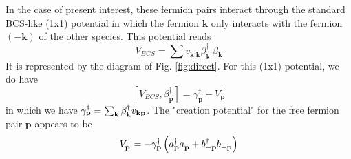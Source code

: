 \documentclass[aps,prb,superscriptaddress,twocolumn]{revtex4}
\newcommand{\vk}{\ensuremath{\mathbf{k}}}
\newcommand{\vp}{\ensuremath{\mathbf{p}}}
\begin{document}
In the case of present interest, these fermion pairs interact through the
standard BCS-like (1x1) potential in which the fermion $\mathbf{k} $ only
interacts with the fermion $\left(-\mathbf{k} \right) $ of the other
species. This potential reads 
\begin{equation}  \label{eq:vbcs}
V_{BCS}=\sum{v_{\mathbf{k} ^{\prime}\mathbf{k} }\beta^{\dagger}_{\mathbf{k}
^{\prime}}\beta^{}_{\mathbf{k} }}
\end{equation}
It is represented by the diagram of Fig. \ref{fig:direct}. For this (1x1)
potential, we do have 
\begin{equation}  \label{eq:vbeta}
\left[V_{BCS},\beta^{\dagger}_\vp\right] 
=\gamma^{\dagger}_\vp+V^{\dagger}_\vp
\end{equation}
in which we have $\gamma^{\dagger}_\vp=\sum_\vk\beta^{\dagger}_\vk{}v_{%
\mathbf{k} \mathbf{p} }$. The "creation potential" for the free fermion pair 
$\mathbf{p} $ appears to be 
\begin{equation}  \label{eq:betaV}
V^{\dagger}_\vp=-{\gamma^{\dagger}_\vp}\left(a^{\dagger}_{\mathbf{p} }a^{}_{%
\mathbf{p} }+b^{\dagger}_{-\mathbf{p} }b^{}_{-\mathbf{p} }\right) 
\end{equation}
\end{document}
